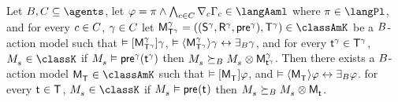 \begin{lemma}\label{aaml-k-covers}
Let $\agentsB, \agentsC \subseteq \agents$, 
let $\phi = \pi \land \bigwedge_{\agentC \in \agentsC} \coverC \Gamma_\agentC \in \langAaml$ where $\pi \in \langPl$, and 
for every $\agentC \in \agentsC$, $\gamma \in \agentsC$
let $\aPModelAndTuple[\gamma]{\aStatesT[\gamma]} \in \classAmK$ be a $\agentsB$-action model such that 
$\entails \actionA{\aPModel[\gamma]{\aStatesT[\gamma]}} \gamma$,
$\entails \actionE{\aPModel[\gamma]{\aStatesT[\gamma]}} \gamma \iff \someactsBs \gamma$, and
for every $\aStateT[\gamma] \in \aStatesT[\gamma]$, $\kPModel{\kStateS} \in \classK$ if $\kPModel{\kStateS} \entails \aPrecondition[\gamma](\aStateT[\gamma])$ then $\kPModel{\kStateS} \simulatesBs \kPModel{\kStateS} \exec \aPModel[\gamma]{\aStateT[\gamma]}$.
Then there exists a $\agentsB$-action model $\aPModel{\aStatesT} \in \classAmK$ such that 
$\entails \actionA{\aPModel{\aStatesT}} \phi$, and 
$\entails \actionE{\aPModel{\aStatesT}} \phi \iff \someactsBs \phi$.
for every $\aStateT \in \aStatesT$, $\kPModel{\kStateS} \in \classK$ if $\kPModel{\kStateS} \entails \aPrecondition(\aStateT)$ then $\kPModel{\kStateS} \simulatesBs \kPModel{\kStateS} \exec \aPModel{\aStateT}$.
\end{lemma}

